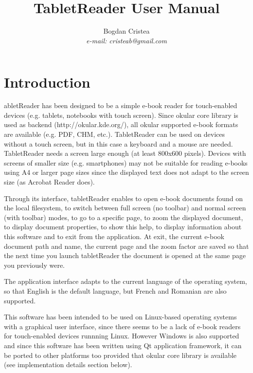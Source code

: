 \documentclass[journal,12pt]{IEEEtran}
\begin{document}
\title{TabletReader User Manual}
\author{Bogdan Cristea\\\textit{e-mail: cristeab@gmail.com}}

\maketitle

\section{Introduction}

abletReader has been designed to be a simple e-book reader for touch-enabled devices (e.g. tablets, notebooks with touch screen). Since okular core library is used as backend (http://okular.kde.org/), all okular supported e-book formats are available (e.g. PDF, CHM, etc.). TabletReader can be used on devices without a touch screen, but in this case a keyboard and a mouse are needed. TabletReader needs a screen large enough (at least 800x600 pixels). Devices with screens of smaller size (e.g. smartphones) may not be suitable for reading e-books using A4 or larger page sizes since the displayed text does not adapt to the screen size (as Acrobat Reader does).

Through its interface, tabletReader enables to open e-book documents found on the local filesystem, to switch between full screen (no toolbar) and normal screen (with toolbar) modes, to go to a specific page, to zoom the displayed document, to display document properties, to show this help, to display information about this software and to exit from the application. At exit, the current e-book document path and name, the current page and the zoom factor are saved so that the next time you launch tabletReader the document is opened at the same page you previously were. 

The application interface adapts to the current language of the operating system, so that English is the default language, but French and Romanian are also supported.

This software has been intended to be used on Linux-based operating systems with a graphical user interface, since there seems to be a lack of e-book readers for touch-enabled devices runnning Linux. However Windows is also supported and since this software has been written using Qt application framework, it can be ported to other platforms too provided that okular core library is available (see implementation details section below).
\end{document}
